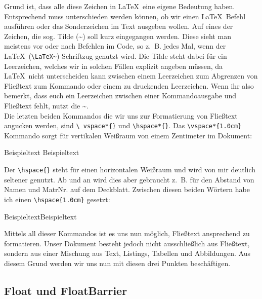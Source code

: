Grund ist, dass alle diese Zeichen in \LaTeX~eine eigene Bedeutung haben.
Entsprechend muss unterschieden werden können, ob wir einen \LaTeX~Befehl
ausführen oder das Sonderzeichen im Text ausgeben wollen. Auf eines der Zeichen,
die sog. Tilde (\textasciitilde) soll kurz eingegangen werden. Diese sieht man
meistens vor oder nach Befehlen im Code, so z. B. jedes Mal, wenn der
\LaTeX~(\verb|\LaTeX~|) Schriftzug genutzt wird. Die Tilde steht dabei für ein
Leerzeichen, welches wir in solchen Fällen explizit angeben müssen, da
\LaTeX~nicht unterscheiden kann zwischen einem Leerzeichen zum Abgrenzen von
Fließtext zum Kommando oder einem zu druckenden Leerzeichen. Wenn ihr also
bemerkt, dass euch ein Leerzeichen zwischen einer Kommandoausgabe und Fließtext
fehlt, nutzt die \textasciitilde. \\ Die letzten beiden Kommandos die wir uns
zur Formatierung von Fließtext angucken werden, sind \texttt{\textbackslash
	vspace*\{\}} und \texttt{\textbackslash hspace*\{\}}. Das
\texttt{\textbackslash vspace*\{1.0cm\}} Kommando sorgt für vertikalen Weißraum
von einem Zentimeter im Dokument:

Beispieltext
\FloatBarrier
\vspace*{1.0cm}
\FloatBarrier
Beispieltext

Der \texttt{\textbackslash hspace\{\}} steht für einen horizontalen Weißraum und wird von mir deutlich seltener genutzt.
Ab und an wird dies aber gebraucht z. B. für den Abstand von Namen und MatrNr. auf dem Deckblatt.
Zwischen diesen beiden Wörtern habe ich einen \texttt{\textbackslash hspace\{1.0cm\}} gesetzt:

Beispieltext\hspace*{1cm}Beispieltext

Mittels all dieser Kommandos ist es uns nun möglich, Fließtext ansprechend zu
formatieren. Unser Dokument besteht jedoch nicht ausschließlich aus Fließtext,
sondern aus einer Mischung aus Text, Listings, Tabellen und Abbildungen. Aus
diesem Grund werden wir uns nun mit diesen drei Punkten beschäftigen.

\subsection{Float und FloatBarrier}

